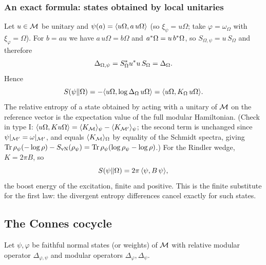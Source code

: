 \subsubsection*{An exact formula: states obtained by local unitaries}
Let $u\in\mathcal{M}$ be unitary and $\psi(a)=\langle u\Omega,a\,u\Omega\rangle$ (so $\xi_\psi=u\Omega$; take $\varphi=\omega_\Omega$ with $\xi_\varphi=\Omega$). For $b=au$ we have $a\,u\Omega=b\Omega$ and $a^{*}\Omega=u\,b^{*}\Omega$, so $S_{\Omega,\psi}=u\,S_\Omega$ and therefore
\begin{equation}
\Delta_{\Omega,\psi}=S_\Omega^{*} u^{*} u\,S_\Omega=\Delta_\Omega.
\end{equation}
Hence
\begin{equation}
S(\psi\|\Omega)=-\langle u\Omega,\log\Delta_\Omega\,u\Omega\rangle=\langle u\Omega,K_\Omega\,u\Omega\rangle.
\end{equation}
The relative entropy of a state obtained by acting with a unitary of $\mathcal{M}$ on the reference vector is the expectation value of the full modular Hamiltonian. (Check in type I: $\langle u\Omega,K u\Omega\rangle=\langle K_{\mathcal{M}}\rangle_\psi-\langle K_{\mathcal{M}'}\rangle_\psi$; the second term is unchanged since $\psi|_{\mathcal{M}'}=\omega|_{\mathcal{M}'}$, and equals $\langle K_{\mathcal{M}}\rangle_\Omega$ by equality of the Schmidt spectra, giving $\operatorname{Tr}\rho_\psi(-\log\rho)-S_{\rm vN}(\rho_\psi)=\operatorname{Tr}\rho_\psi(\log\rho_\psi-\log\rho)$.) For the Rindler wedge, $K=2\pi B$, so
\begin{equation}
S(\psi\|\Omega)=2\pi\,\langle \psi,B\,\psi\rangle,
\end{equation}
the boost energy of the excitation, finite and positive. This is the finite substitute for the first law: the divergent entropy differences cancel exactly for such states.

\subsection{The Connes cocycle}

Let $\psi,\varphi$ be faithful normal states (or weights) of $\mathcal{M}$ with relative modular operator $\Delta_{\varphi,\psi}$ and modular operators $\Delta_\varphi,\Delta_\psi$.

